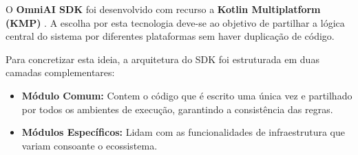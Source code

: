     O \textbf{OmniAI SDK} foi desenvolvido com recurso a \textbf{Kotlin Multiplatform (KMP)} \cite{kmp_ref}. A escolha por esta tecnologia deve-se ao objetivo de partilhar a lógica central do sistema por diferentes plataformas sem haver duplicação de código.

    Para concretizar esta ideia, a arquitetura do SDK foi estruturada em duas camadas complementares:
    \begin{itemize}
        \item \textbf{Módulo Comum:} Contem o código que é escrito uma única vez e partilhado por todos os ambientes de execução, garantindo a consistência das regras.
        
        \item \textbf{Módulos Específicos:} Lidam com as funcionalidades de infraestrutura que variam consoante o ecossistema.
    \end{itemize}


